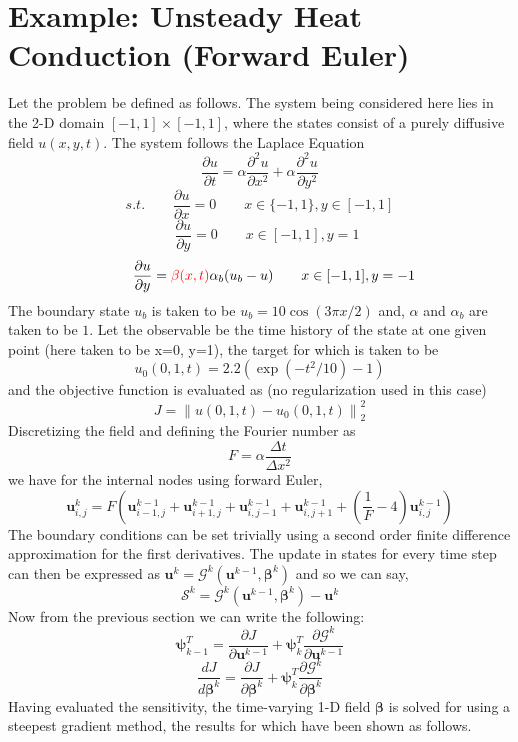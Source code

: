 \documentclass{article}
\begin{document}
\section{Example: Unsteady Heat Conduction (Forward Euler)}
Let the problem be defined as follows. The system being considered here lies in the 2-D domain $[-1,1]\times[-1,1]$, where the states consist of a purely diffusive field
$u(x,y,t)$. The system follows the Laplace Equation
$$
\frac{\partial u}{\partial t} = \alpha\frac{\partial^2 u}{\partial x^2} + \alpha\frac{\partial^2 u}{\partial y^2}
$$
$$
s.t.\qquad \frac{\partial u}{\partial x} = 0 \qquad x\in\lbrace-1,1\rbrace, y\in[-1,1]
$$
$$
\qquad \frac{\partial u}{\partial y}=0 \qquad x\in[-1,1], y=1\quad
$$
$$
\qquad \frac{\partial u}{\partial y}={\color{red}\beta(x,t)}\alpha_b(u_b-u) \qquad x\in[-1,1], y=-1
$$
The boundary state $u_b$ is taken to be $u_b=10\cos(3\pi x/2)$ and, $\alpha$ and $\alpha_b$ are taken to be $1$.
Let the observable be the time history of the state at one given point (here taken to be x=0, y=1), the target for which is taken to be 
$$
u_0(0,1,t) = 2.2(\exp(-t^2/10)-1)
$$
and the objective function is evaluated as (no regularization used in this case)
$$
J = \left\lVert u(0,1,t) - u_0(0,1,t) \right\rVert_2^2
$$
Discretizing the field and defining the Fourier number as $$F=\alpha\frac{\Delta t}{\Delta x^2}$$ we have for the internal nodes using forward Euler,
$$
\boldsymbol{u}^{k}_{i,j} = F\left(\boldsymbol{u}^{k-1}_{i-1,j} + \boldsymbol{u}^{k-1}_{i+1,j} + \boldsymbol{u}^{k-1}_{i,j-1} + 
			   \boldsymbol{u}^{k-1}_{i,j+1} + \left(\frac{1}{F}-4\right) \boldsymbol{u}^{k-1}_{i,j}\right)
$$
The boundary conditions can be set trivially using a second order finite difference approximation for the first derivatives. The update in states for every time step can then
be expressed as $\boldsymbol{u}^k = \boldsymbol{\mathcal{G}}^k(\boldsymbol{u}^{k-1}, \boldsymbol{\beta}^k)$ and so we can say,
$$
\boldsymbol{\mathcal{S}}^k = \boldsymbol{\mathcal{G}}^k(\boldsymbol{u}^{k-1}, \boldsymbol{\beta}^k) - \boldsymbol{u}^k
$$
Now from the previous section we can write the following:
$$
\boldsymbol{\psi}_{k-1}^T = \frac{\partial J}{\partial \boldsymbol{u}^{k-1}} + \boldsymbol{\psi}_k^T\frac{\partial\boldsymbol{\mathcal{G}}^k}{\partial \boldsymbol{u}^{k-1}}
$$
$$
\frac{dJ}{d\boldsymbol{\beta}^k} = \frac{\partial J}{\partial \boldsymbol{\beta}^k} 
                                   + \boldsymbol{\psi}_k^T\frac{\partial\boldsymbol{\mathcal{G}}^k}{\partial \boldsymbol{\beta}^k}
$$
Having evaluated the sensitivity, the time-varying 1-D field $\boldsymbol\beta$ is solved for using a steepest gradient method, the results for which have been shown as follows.
\end{document}
